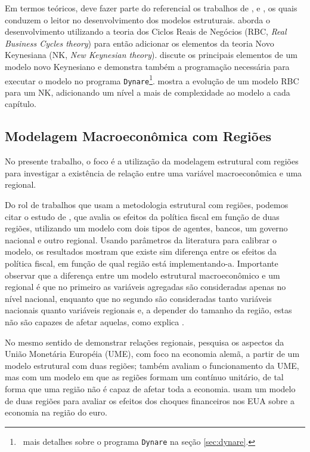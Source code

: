 \documentclass[12pt]{article}
\newcommand{\dynare}{\texttt{Dynare}}
\numberwithin{equation}{section}
\theoremstyle{definition}
\begin{document}
Em termos teóricos, deve fazer parte do referencial os trabalhos de \textcite{costa_junior_understanding_2016}, \textcite{bergholt_basic_2012} e \textcite{gali_monetary_2015}, os quais conduzem o leitor no desenvolvimento dos modelos estruturais. \textcite{costa_junior_understanding_2016} aborda o desenvolvimento utilizando a teoria dos Ciclos Reais de Negócios (RBC, \textit{Real Business Cycles theory}) para então adicionar os elementos da teoria Novo Keynesiana (NK, \textit{New Keynesian theory}). \textcite{bergholt_basic_2012} discute os principais elementos de um modelo novo Keynesiano e demonstra também a programação necessária para executar o modelo no programa \dynare{}\footnote{$\,$ mais detalhes sobre o programa \dynare{} na seção \ref{sec:dynare}. }. \textcite{gali_monetary_2015} mostra a evolução de um modelo RBC para um NK, adicionando um nível a mais de complexidade ao modelo a cada capítulo.

\subsection{Modelagem Macroeconômica com Regiões}

No presente trabalho, o foco é a utilização da modelagem estrutural com regiões para investigar a existência de relação entre uma variável macroeconômica e uma regional.

Do rol de trabalhos que usam a metodologia estrutural com regiões, podemos citar o estudo de \textcite{tamegawa_two-region_2012}, que avalia os efeitos da política fiscal em função de duas regiões, utilizando um modelo com dois tipos de agentes, bancos, um governo nacional e outro regional. Usando parâmetros da literatura para calibrar o modelo, os resultados mostram que existe sim diferença entre os efeitos da política fiscal, em função de qual região está implementando-a. Importante observar que a diferença entre um modelo estrutural macroeconômico e um regional é que no primeiro as variáveis agregadas são consideradas apenas no nível nacional, enquanto que no segundo são consideradas tanto variáveis nacionais quanto variáveis regionais e, a depender do tamanho da região, estas não são capazes de afetar aquelas, como explica \textcite{tamegawa_constructing_2013}.

No mesmo sentido de demonstrar relações regionais, \textcite{pytlarczyk_estimated_2005} pesquisa os aspectos da União Monetária Européia (UME), com foco na economia alemã, a partir de um modelo estrutural com duas regiões; \textcite{gali_optimal_2005} também avaliam o funcionamento da UME, mas com um modelo em que as regiões formam um contínuo unitário, de tal forma que uma região não é capaz de afetar toda a economia. \textcite{alpanda_international_2014} usam um modelo de duas regiões para avaliar os efeitos dos choques financeiros nos EUA sobre a economia na região do euro.
\end{document}
